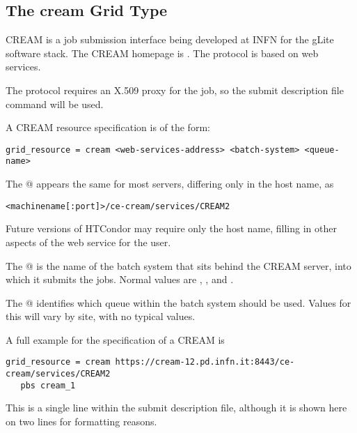 
\subsection{\label{sec:CREAM}The cream Grid Type }

CREAM is a job submission interface being developed at INFN for the
gLite software stack. 
The CREAM homepage is .
The protocol is based on web services.

The protocol requires an X.509 proxy for the job,
so the submit description file command 
will be used.

A CREAM resource specification is of the form:
\footnotesize
\begin{verbatim}
grid_resource = cream <web-services-address> <batch-system> <queue-name>
\end{verbatim}
\normalsize
The @ appears the same for most servers,
differing only in the host name, as
\begin{verbatim}
<machinename[:port]>/ce-cream/services/CREAM2
\end{verbatim}
Future versions of HTCondor may require only the host name, 
filling in other aspects of the web service for the user.

The @ is the name of the batch system that sits behind
the CREAM server,
into which it submits the jobs.
Normal values are \verb@pbs@, \verb@lsf@, and \verb@condor@.

The @ identifies which queue within the batch system
should be used.
Values for this will vary by site, with no typical values.

A full example for the specification of a CREAM  is
\footnotesize
\begin{verbatim}
grid_resource = cream https://cream-12.pd.infn.it:8443/ce-cream/services/CREAM2
   pbs cream_1
\end{verbatim}
\normalsize
This is a single line within the submit description file,
although it is shown here on two lines for formatting reasons.

